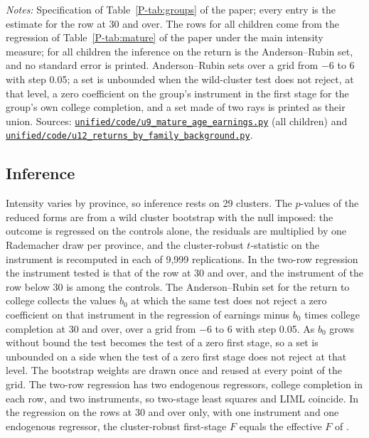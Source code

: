 \documentclass[11pt]{article}
\numberwithin{equation}{section}
\newcommand{\repourl}{https://github.com/JiachenJin1001/family-background-earnings-china}
\newcommand{\code}[1]{\href{\repourl/blob/main/#1}{\nolinkurl{#1}}}
\begin{document}
\begin{table}[H]
\centering
\small
\caption{Returns to college for all children and by family background, with unweighted and
with weighted rows.}
\label{oatab:groups}
\setlength{\tabcolsep}{4pt}
\resizebox{\ifdim\width>\textwidth\textwidth\else\width\fi}{!}{}
\par\smallskip
\begin{minipage}{0.94\textwidth}
\footnotesize\emph{Notes:} Specification of Table~\ref{P-tab:groups} of
the paper; every entry is the estimate for the row at 30 and over. The rows for all children come from the regression of Table~\ref{P-tab:mature} of the paper under the main intensity measure; for all children the inference on the return is the Anderson--Rubin set, and no standard error is printed.
Anderson--Rubin sets over a grid from $-6$ to 6 with step 0.05; a set is unbounded when the wild-cluster test does not reject, at that level, a zero coefficient on the group's instrument in the first stage for the group's own college completion, and a set made of two rays is printed as their union. Sources: \code{unified/code/u9_mature_age_earnings.py} (all children) and \code{unified/code/u12_returns_by_family_background.py}.
\end{minipage}
\end{table}

\subsection{Inference}

Intensity varies by province, so inference rests on 29 clusters. The
$p$-values of the reduced forms are from a wild cluster bootstrap with
the null imposed: the outcome is regressed on the controls alone, the
residuals are multiplied by one Rademacher draw per province, and the cluster-robust $t$-statistic on the instrument is recomputed in each
of 9,999 replications. In the two-row regression the instrument tested is that of the row at 30 and over, and the instrument of the row
below 30 is among the controls. The Anderson--Rubin set for the return to college collects the values $b_0$ at which the same test does not
reject a zero coefficient on that instrument in the regression of
earnings minus $b_0$ times college completion at 30 and over, over a
grid from $-6$ to 6 with step 0.05. As $b_0$ grows without bound the test becomes the test of a zero first stage, so a set is unbounded on a side when the test of a zero first stage does not reject at that level. The bootstrap weights are
drawn once and reused at every point of the grid. The two-row
regression has two endogenous regressors, college completion in each
row, and two instruments, so two-stage least squares and LIML coincide.
In the regression on the rows at 30 and over only, with one instrument
and one endogenous regressor, the cluster-robust first-stage $F$ equals
the effective $F$ of \citet{OleaPflueger2013}.
\end{document}
